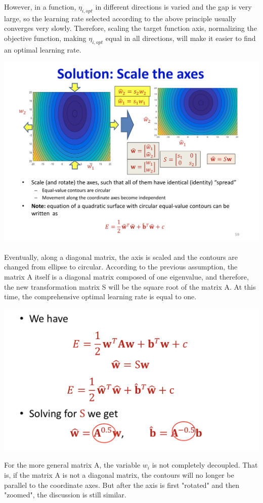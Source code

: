 \documentclass{article}
\begin{document}
	However, in a function, $\eta_{i,opt}$ in different directions is varied and the gap is very large, so the learning rate selected according to the above principle usually converges very slowly. Therefore, scaling the target function axis, normalizing the objective function, making $\eta_{i,opt}$ equal in all directions, will make it easier to find an optimal learning rate.
	
	\includegraphics[scale=0.2]{76.png}
	
	Eventually, along a diagonal matrix, the axis is scaled and the contours are changed from ellipse to circular. According to the previous assumption, the matrix A itself is a diagonal matrix composed of one eigenvalue, and therefore, the new transformation matrix S will be the square root of the matrix A. At this time, the comprehensive optimal learning rate is equal to one.
	
	\includegraphics[scale=0.2]{77.png}
	
	For the more general matrix A, the variable $w_i$ is not completely decoupled. That is, if the matrix A is not a diagonal matrix, the contours will no longer be parallel to the coordinate axes. But after the axis is first "rotated" and then "zoomed", the discussion is still similar.
	
\end{document}
